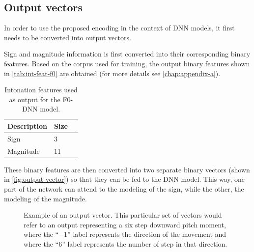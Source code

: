 \subsection{Output vectors}


In order to use the proposed encoding in the context of \ac{DNN} models, it first needs to be converted into output vectors.

Sign and magnitude information is first converted into their corresponding binary features. Based on the corpus used for training, the output binary features shown in \autoref{tab:int-feat-f0} are obtained (for more details see \autoref{chap:appendix-a}).

\begin{table}[h!]
  \centering
  \begin{tabular}{llc}
    \toprule
    \textbf{Description} & \textbf{Size} \\
    \midrule
    Sign                 &    3 \\
    Magnitude            &   11 \\
    \bottomrule
  \end{tabular}
    \caption[Intonation model \ac{F0} features]{Intonation features used as output for the \acs{F0}-\acs{DNN} model.}
  \label{tab:int-feat-f0}
\end{table}

These binary features are then converted into two separate binary vectors (shown in \autoref{fig:output-vector}) so that they can be fed to the \ac{DNN} model. This way, one part of the network can attend to the modeling of the sign, while the other, the modeling of the magnitude.


\begin{figure}[H]
\centering
\scalebox{0.9}{}
\caption[Example of an output vector]{Example of an output vector. This particular set of vectors would refer to an output representing a six step downward pitch moment, where the ``$-1$'' label represents the direction of the movement and where the ``$6$'' label represents the number of step in that direction.}
\label{fig:output-vector}
\end{figure}







